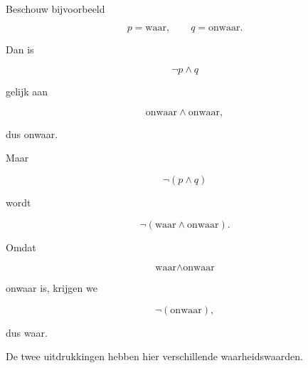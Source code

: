 \documentclass{ximera}
\begin{document}

  Beschouw bijvoorbeeld

  \[
  p=\text{waar},
  \qquad
  q=\text{onwaar}.
  \]

  Dan is

  \[
  \neg p\land q
  \]

  gelijk aan

  \[
  \text{onwaar}\land\text{onwaar},
  \]

  dus onwaar.

  Maar

  \[
  \neg(p\land q)
  \]

  wordt

  \[
  \neg(\text{waar}\land\text{onwaar}).
  \]

  Omdat

  \[
  \text{waar}\land\text{onwaar}
  \]

  onwaar is, krijgen we

  \[
  \neg(\text{onwaar}),
  \]

  dus waar.

  De twee uitdrukkingen hebben hier verschillende waarheidswaarden.
\end{document}
